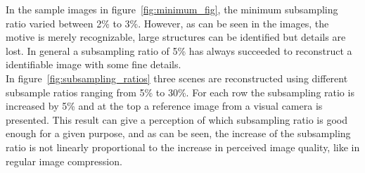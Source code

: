 In the sample images in figure~\ref{fig:minimum_fig}, the minimum subsampling ratio varied between 2\% to 3\%. However, as can be seen in the images, the motive is merely recognizable, large structures can be identified but details are lost. In general a subsampling ratio of 5\% has always succeeded to reconstruct a identifiable image with some fine details.\\[0.1in]


In figure~\ref{fig:subsampling_ratios} three scenes are reconstructed using different subsample ratios ranging from 5\% to 30\%. For each row the subsampling ratio is increased by 5\% and at the top a reference image from a visual camera is presented. This result can give a perception of which subsampling ratio is good enough for a given purpose, and as can be seen, the increase of the subsampling ratio is not linearly proportional to the increase in perceived image quality, like in regular image compression.
     

